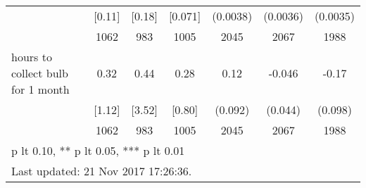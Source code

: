 \begin{table}[htbp]
\begin{tabular*}{1\hsize}{@{\hskip\tabcolsep\extracolsep\fill}l*{1}{cccccc}}
                                &   [0.11]&   [0.18]&  [0.071]& (0.0038)         & (0.0036)         & (0.0035)         \\
                                &     1062&      983&     1005&     2045         &     2067         &     1988         \\
hours to collect bulb for 1 month&     0.32&     0.44&     0.28&     0.12         &   -0.046         &    -0.17\sym{*}  \\
                                &   [1.12]&   [3.52]&   [0.80]&  (0.092)         &  (0.044)         &  (0.098)         \\
                                &     1062&      983&     1005&     2045         &     2067         &     1988         \\
\bottomrule
\multicolumn{7}{l}{\footnotesize * p lt 0.10, ** p lt 0.05, *** p lt 0.01}\\
\multicolumn{7}{l}{\footnotesize Last updated: 21 Nov 2017 17:26:36.}\\
\end{tabular*}
\end{table}
